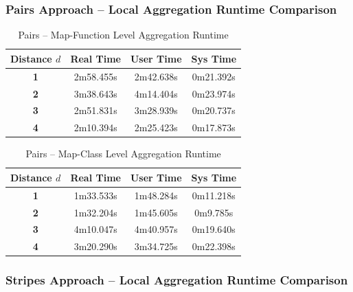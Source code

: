 \documentclass[12pt,a4paper]{article}
\begin{document}
\subsubsection{Pairs Approach -- Local Aggregation Runtime Comparison}
\begin{table}[H]
  \centering
  \caption{Pairs -- Map-Function Level Aggregation Runtime}
  \label{tab:pairs_fn_agg}
  \renewcommand{\arraystretch}{1.4}
  \begin{tabular}{>{\bfseries}c ccc}
    \toprule
    \rowcolor{lightblue}
    \textbf{Distance $d$} & \textbf{Real Time} & \textbf{User Time} & \textbf{Sys Time} \\
    \midrule
    1 & 2m58.455s & 2m42.638s & 0m21.392s \\
    2 & 3m38.643s & 4m14.404s & 0m23.974s \\
    3 & 2m51.831s & 3m28.939s & 0m20.737s \\
    4 & 2m10.394s & 2m25.423s & 0m17.873s \\
    \bottomrule
  \end{tabular}
\end{table}

\begin{table}[H]
  \centering
  \caption{Pairs -- Map-Class Level Aggregation Runtime}
  \label{tab:pairs_cls_agg}
  \renewcommand{\arraystretch}{1.4}
  \begin{tabular}{>{\bfseries}c ccc}
    \toprule
    \rowcolor{lightblue}
    \textbf{Distance $d$} & \textbf{Real Time} & \textbf{User Time} & \textbf{Sys Time} \\
    \midrule
    1 & 1m33.533s & 1m48.284s & 0m11.218s \\
    2 & 1m32.204s & 1m45.605s & 0m9.785s \\
    3 & 4m10.047s & 4m40.957s & 0m19.640s \\
    4 & 3m20.290s & 3m34.725s & 0m22.398s \\
    \bottomrule
  \end{tabular}
\end{table}

\subsubsection{Stripes Approach -- Local Aggregation Runtime Comparison}
\end{document}
